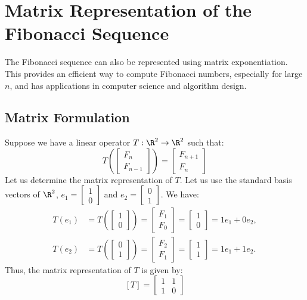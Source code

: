 \documentclass[openany]{book}
\begin{document}
\section{Matrix Representation of the Fibonacci Sequence}
The Fibonacci sequence can also be represented using matrix exponentiation. This provides an efficient way to compute Fibonacci numbers, especially for large $n$, and has applications in computer science and algorithm design.
\subsection{Matrix Formulation}
Suppose we have a linear operator $T : \R^2 \to \R^2$ such that: 
$$T(\begin{bmatrix}F_n \\ F_{n-1} \end{bmatrix}) = \begin{bmatrix}F_{n+1} \\ F_n \end{bmatrix}$$
Let us determine the matrix representation of $T$. Let us use the standard basis vectors of $\R^2$, $e_1 = \begin{bmatrix}1 \\ 0 \end{bmatrix}$ and $e_2 = \begin{bmatrix}0 \\ 1 \end{bmatrix}$. We have:
\begin{align*}
    T(e_1) &= T(\begin{bmatrix}1 \\ 0 \end{bmatrix}) = \begin{bmatrix}F_1 \\ F_0 \end{bmatrix} = \begin{bmatrix}1 \\ 0 \end{bmatrix} = 1e_1 + 0e_2, \\
    T(e_2) &= T(\begin{bmatrix}0 \\ 1 \end{bmatrix}) = \begin{bmatrix}F_2 \\ F_1 \end{bmatrix} = \begin{bmatrix}1 \\ 1 \end{bmatrix} = 1e_1 + 1e_2.
\end{align*}
Thus, the matrix representation of $T$ is given by:
\[
    [T] = \begin{bmatrix}1 & 1 \\ 1 & 0 \end{bmatrix}
\]
\end{document}
